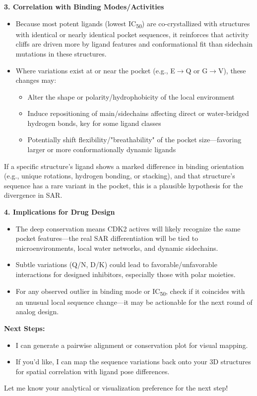 \documentclass{article}
\begin{document}
\begin{assistantbox}
\textbf{3. Correlation with Binding Modes/Activities}
\begin{itemize}
    \item Because most potent ligands (lowest IC\textsubscript{50}) are co-crystallized with structures with identical or nearly identical pocket sequences, it reinforces that activity cliffs are driven more by ligand features and conformational fit than sidechain mutations in these structures.
    \item Where variations exist at or near the pocket (e.g., E$\rightarrow$Q or G$\rightarrow$V), these changes may:
    \begin{itemize}
        \item Alter the shape or polarity/hydrophobicity of the local environment
        \item Induce repositioning of main/sidechains affecting direct or water-bridged hydrogen bonds, key for some ligand classes
        \item Potentially shift flexibility/"breathability" of the pocket size—favoring larger or more conformationally dynamic ligands
    \end{itemize}
\end{itemize}
If a specific structure's ligand shows a marked difference in binding orientation (e.g., unique rotations, hydrogen bonding, or stacking), and that structure's sequence has a rare variant in the pocket, this is a plausible hypothesis for the divergence in SAR.

\textbf{4. Implications for Drug Design}
\begin{itemize}
    \item The deep conservation means CDK2 actives will likely recognize the same pocket features—the real SAR differentiation will be tied to microenvironments, local water networks, and dynamic sidechains.
    \item Subtle variations (Q/N, D/K) could lead to favorable/unfavorable interactions for designed inhibitors, especially those with polar moieties.
    \item For any observed outlier in binding mode or IC\textsubscript{50}, check if it coincides with an unusual local sequence change—it may be actionable for the next round of analog design.
\end{itemize}

\textbf{Next Steps:}
\begin{itemize}
    \item I can generate a pairwise alignment or conservation plot for visual mapping.
    \item If you'd like, I can map the sequence variations back onto your 3D structures for spatial correlation with ligand pose differences.
\end{itemize}

Let me know your analytical or visualization preference for the next step!
\end{assistantbox}
\end{document}
